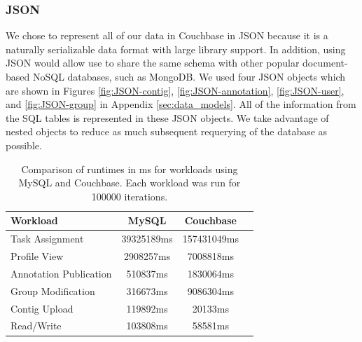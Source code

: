 \documentclass[10pt, conference, compsocconf]{IEEEtran}
\begin{document}
\subsubsection{JSON}
We chose to represent all of our data in Couchbase in JSON because it is a
naturally serializable data format with large library support. In addition,
using JSON would allow use to share the same schema with other popular
document-based NoSQL databases, such as MongoDB.  We used four JSON objects
which are shown in Figures \ref{fig:JSON-contig}, \ref{fig:JSON-annotation},
\ref{fig:JSON-user}, and \ref{fig:JSON-group} in Appendix
\ref{sec:data_models}. All of the information from the SQL tables is
represented in these JSON objects. We take advantage of nested objects to
reduce as much subsequent requerying of the database as possible.

\begin{table}[t]
   \centering
      \begin{tabular}{| l | c | c | c |}
         \hline
            {\textbf{Workload}} &
            {\textbf{MySQL}} &
            {\textbf{Couchbase}} \\
         \hline
            Task Assignment         & 39325189ms & 157431049ms\footnotemark{} \\
         \hline
            Profile View            & 2908257ms & 7008818ms \\
         \hline
            Annotation Publication  & 510837ms & 1830064ms \\
         \hline
            Group Modification      & 316673ms & 9086304ms \\
         \hline
            Contig Upload           & 119892ms & 20133ms \\
         \hline
            Read/Write              & 103808ms & 58581ms \\
         \hline
      \end{tabular}
      \caption{Comparison of runtimes in ms for workloads using MySQL and Couchbase.
               Each workload was run for 100000 iterations.}
      \label{tab:workload_perf}
\end{table}
\end{document}
